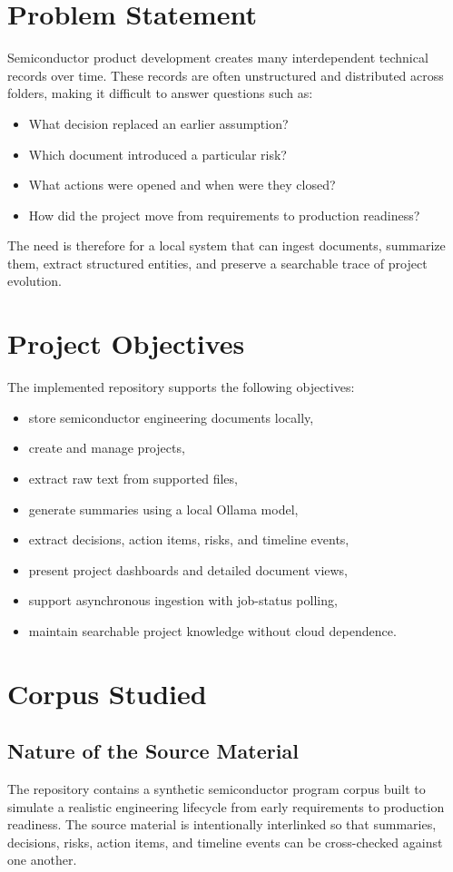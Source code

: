 \documentclass[12pt, a4paper]{article}
\begin{document}
\section{Problem Statement}
Semiconductor product development creates many interdependent technical records over time. These records are often unstructured and distributed across folders, making it difficult to answer questions such as:
\begin{itemize}
\item What decision replaced an earlier assumption?
\item Which document introduced a particular risk?
\item What actions were opened and when were they closed?
\item How did the project move from requirements to production readiness?
\end{itemize}

The need is therefore for a local system that can ingest documents, summarize them, extract structured entities, and preserve a searchable trace of project evolution.

\section{Project Objectives}
The implemented repository supports the following objectives:
\begin{itemize}
\item store semiconductor engineering documents locally,
\item create and manage projects,
\item extract raw text from supported files,
\item generate summaries using a local Ollama model,
\item extract decisions, action items, risks, and timeline events,
\item present project dashboards and detailed document views,
\item support asynchronous ingestion with job-status polling,
\item maintain searchable project knowledge without cloud dependence.
\end{itemize}

\section{Corpus Studied}
\subsection{Nature of the Source Material}
The repository contains a synthetic semiconductor program corpus built to simulate a realistic engineering lifecycle from early requirements to production readiness. The source material is intentionally interlinked so that summaries, decisions, risks, action items, and timeline events can be cross-checked against one another.
\end{document}
